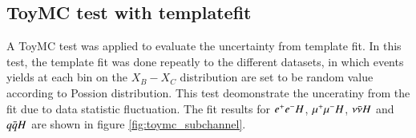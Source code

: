 \subsection{ToyMC test with templatefit}
A ToyMC test was applied to evaluate the uncertainty from template fit. In this test, the template fit was done repeatly to the different datasets, in which events yields at each bin on the $X_B-X_C$ distribution are set to be random value according to Possion distribution. This test deomonstrate the unceratiny from the fit  due to data statistic fluctuation. The fit results for $e^{+}e^{-}H$, $\mu^{+}\mu^{-}H$, $\nu \bar{\nu} H$ and $q\bar{q}H$ are shown in figure \ref{fig:toymc_subchannel}. 

\begin{figure}[!htpb]
\centering
{}
\subfigure[]
{
}
\end{figure}
